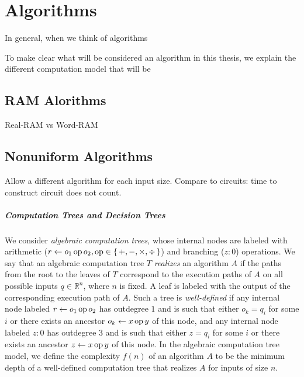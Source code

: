 \chapter{Algorithms}

In general, when we think of algorithms 



To make clear what will be considered an algorithm in this thesis, we explain
the different computation model that will be

\section{RAM Alorithms}

Real-RAM vs Word-RAM

\section{Nonuniform Algorithms}



Allow a different algorithm for each input size.
Compare to circuits: time to construct circuit does not count.

\paragraph{Computation Trees and Decision Trees}
We consider \emph{algebraic computation trees}, whose internal nodes
are labeled with arithmetic (\(r \gets o_1 \operatorname{op} o_2, \operatorname{op} \in
\{\,+,-,\times,\div\,\}\)) and branching (\(z : 0\)) operations. We say that an
algebraic computation tree $T$ \emph{realizes} an algorithm $A$ if the paths
from the root to the leaves of $T$ correspond to the execution paths of \(A\)
on all possible inputs \(q \in \mathbb{R}^n\), where \(n\) is fixed. A leaf is
labeled with the output of the corresponding execution path of \(A\). Such a
tree is \emph{well-defined} if any internal node labeled \(r \gets o_1 \operatorname{op}
o_2\) has outdegree \(1\) and is such that either \(o_k = q_i\) for some \(i\)
or there exists an ancestor \(o_k \gets x \operatorname{op} y\) of this node, and any
internal node labeled \(z : 0\) has outdegree \(3\) and is such that either \(z
= q_i\) for some \(i\) or there exists an ancestor \(z \gets x \operatorname{op} y\) of this
node. In the algebraic computation tree model, we define the complexity
\(f(n)\) of an algorithm $A$ to be the minimum depth of a well-defined
computation tree that realizes $A$ for inputs of size $n$.

